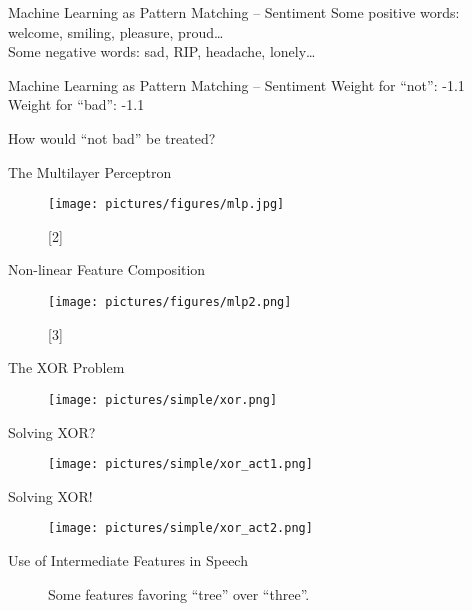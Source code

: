 \documentclass{beamer}
\begin{document}
\begin{frame}{Machine Learning as Pattern Matching -- Sentiment}
Some positive words: welcome, smiling, pleasure, proud\ldots\\ \medskip
Some negative words: sad, RIP, headache, lonely\ldots
\end{frame}


\begin{frame}{Machine Learning as Pattern Matching -- Sentiment}
Weight for ``not'': -1.1\\
Weight for ``bad'': -1.1\\ \medskip

How would ``not bad'' be treated? 
\end{frame}


\begin{frame}{The Multilayer Perceptron}
\begin{figure}
\texttt{[image: pictures/figures/mlp.jpg]}
\caption*{[2]}
\end{figure}
\end{frame}


\begin{frame}{Non-linear Feature Composition}
\begin{figure}
\texttt{[image: pictures/figures/mlp2.png]}
\caption*{[3]}
\end{figure}
\end{frame}


\begin{frame}{The XOR Problem}
\begin{figure}
\texttt{[image: pictures/simple/xor.png]}
\end{figure}
\end{frame}


\begin{frame}{Solving XOR?}
\begin{figure}
\texttt{[image: pictures/simple/xor\_act1.png]}
\end{figure}
\end{frame}


\begin{frame}{Solving XOR!}
\begin{figure}
\texttt{[image: pictures/simple/xor\_act2.png]}
\end{figure}
\end{frame}


\begin{frame}{Use of Intermediate Features in Speech}
\begin{figure}
\hfil
{}
\end{figure}
\begin{figure}
\hfil
{}
\caption*{Some features favoring ``tree'' over ``three''.}
\end{figure}
\end{frame}
\end{document}
